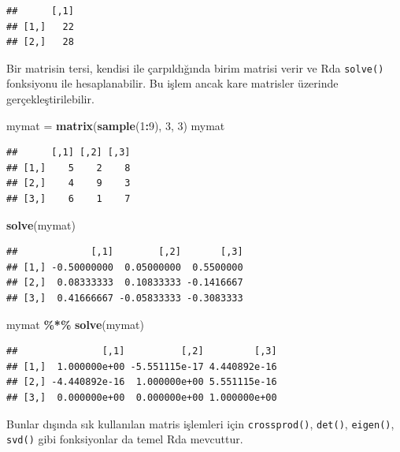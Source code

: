 \documentclass[
]{book}
\newenvironment{Shaded}{\begin{snugshade}}{\end{snugshade}}
\newcommand{\DecValTok}[1]{\textcolor[rgb]{0.00,0.00,0.81}{#1}}
\newcommand{\KeywordTok}[1]{\textcolor[rgb]{0.13,0.29,0.53}{\textbf{#1}}}
\newcommand{\NormalTok}[1]{#1}
\newcommand{\OperatorTok}[1]{\textcolor[rgb]{0.81,0.36,0.00}{\textbf{#1}}}
\newcommand{\StringTok}[1]{\textcolor[rgb]{0.31,0.60,0.02}{#1}}
\begin{document}
\begin{verbatim}
##      [,1]
## [1,]   22
## [2,]   28
\end{verbatim}

Bir matrisin tersi, kendisi ile çarpıldığında birim matrisi verir ve Rda \texttt{solve()} fonksiyonu ile hesaplanabilir. Bu işlem ancak kare matrisler üzerinde gerçekleştirilebilir.

\begin{Shaded}
\begin{Highlighting}[]
\NormalTok{mymat =}\StringTok{ }\KeywordTok{matrix}\NormalTok{(}\KeywordTok{sample}\NormalTok{(}\DecValTok{1}\OperatorTok{:}\DecValTok{9}\NormalTok{), }\DecValTok{3}\NormalTok{, }\DecValTok{3}\NormalTok{)}
\NormalTok{mymat}
\end{Highlighting}
\end{Shaded}

\begin{verbatim}
##      [,1] [,2] [,3]
## [1,]    5    2    8
## [2,]    4    9    3
## [3,]    6    1    7
\end{verbatim}

\begin{Shaded}
\begin{Highlighting}[]
\KeywordTok{solve}\NormalTok{(mymat)}
\end{Highlighting}
\end{Shaded}

\begin{verbatim}
##             [,1]        [,2]       [,3]
## [1,] -0.50000000  0.05000000  0.5500000
## [2,]  0.08333333  0.10833333 -0.1416667
## [3,]  0.41666667 -0.05833333 -0.3083333
\end{verbatim}

\begin{Shaded}
\begin{Highlighting}[]
\NormalTok{mymat }\OperatorTok{\%*\%}\StringTok{ }\KeywordTok{solve}\NormalTok{(mymat)}
\end{Highlighting}
\end{Shaded}

\begin{verbatim}
##               [,1]          [,2]         [,3]
## [1,]  1.000000e+00 -5.551115e-17 4.440892e-16
## [2,] -4.440892e-16  1.000000e+00 5.551115e-16
## [3,]  0.000000e+00  0.000000e+00 1.000000e+00
\end{verbatim}

Bunlar dışında sık kullanılan matris işlemleri için \texttt{crossprod()}, \texttt{det()}, \texttt{eigen()}, \texttt{svd()} gibi fonksiyonlar da temel Rda mevcuttur.
\end{document}
